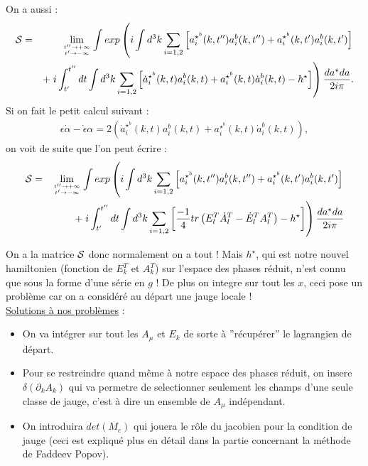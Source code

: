 \documentclass[a4paper,11pt]{article} %
\theoremstyle{plain}
\theoremstyle{definition}
\theoremstyle{remark}
\numberwithin{equation}{section}
\numberwithin{equation}{subsection}
\numberwithin{figure}{section}
\begin{document}
\noindent
On a aussi :
\begin{eqnarray*}
 \mathcal{S} &=& \lim_{t'' \to + \infty \atop t' \to - \infty}
\int exp \left( 
i \int d^{3}k \sum_{i=1,2} \left[ a^{\star^{b}}_{i}(k,t'') a^{b}_{i}(k,t'') + a^{\star^{b}}_{i}(k,t') a^{b}_{i}(k,t') \right] \right. \nonumber \\ 
&& + \left. i \int^{t''}_{t'} dt \int d^{3}k 
\sum_{i=1,2} \left[ \dot{a}^{\star^{b}}_{i}(k,t) a^{b}_{i}(k,t) + a^{\star^{b}}_{i}(k,t) \dot{a}^{b}_{i}(k,t) - h^{\star} \right]
\right) \frac{da^{\star} da}{2i \pi}. \nonumber  \\
\end{eqnarray*}
Si on fait le petit calcul suivant :
\begin{eqnarray*}
 \epsilon \dot{\alpha} - \dot{\epsilon} \alpha = 2 \left(\dot{a}^{\star^{b}}_{i}(k,t) a^{b}_{i}(k,t) 
+ a^{\star^{b}}_{i}(k,t) \dot{a}^{b}_{i}(k,t) \right),
\end{eqnarray*}
on voit de suite que l'on peut écrire :
\begin{eqnarray*}
 \mathcal{S} &=& \lim_{t'' \to + \infty \atop t' \to - \infty}
\int exp \left( 
i \int d^{3}k \sum_{i=1,2} \left[ a^{\star^{b}}_{i}(k,t'') a^{b}_{i}(k,t'') + a^{\star^{b}}_{i}(k,t') a^{b}_{i}(k,t') \right] \right. \nonumber  \\ 
&& + \left. i \int^{t''}_{t'} dt \int d^{3}k 
\sum_{i=1,2} \left[ \frac{-1}{4} tr\left(E^{T}_{l} \dot{A}^{T}_{l} - \dot{E}^{T}_{l} A^{T}_{l} \right)  - h^{\star} \right]
\right) \frac{da^{\star} da}{2i \pi}
\end{eqnarray*}

\noindent
On a la matrice $\cal{S}$ donc normalement on a tout ! Mais $h^{\star}$, qui est notre nouvel hamiltonien (fonction de $E^{T}_{k}$ et $A^{T}_{k}$) sur l'espace des phases réduit, n'est connu que sous la forme d'une série en $g$ ! De plus on integre sur tout les $x$, ceci pose un problème car on a considéré au départ une jauge locale !\\

\noindent
\underline{Solutions à nos problèmes} :\\
\begin{itemize}
 \item On va intégrer sur tout les $A_{\mu}$ et $E_{k}$ de sorte à ''récupérer'' le lagrangien de départ.
 \item Pour se restreindre quand même à notre espace des phases réduit, on insere $\delta \left( \partial_{k} A_{k} \right)$ qui va permetre de selectionner seulement les champs d'une seule classe de jauge, c'est à dire un ensemble de $A_{\mu}$ indépendant.
 \item On introduira $det(M_{c})$ qui jouera le rôle du jacobien pour la condition de jauge (ceci est expliqué plus en détail dans la partie concernant la méthode de Faddeev Popov).
\end{itemize}
\end{document}
